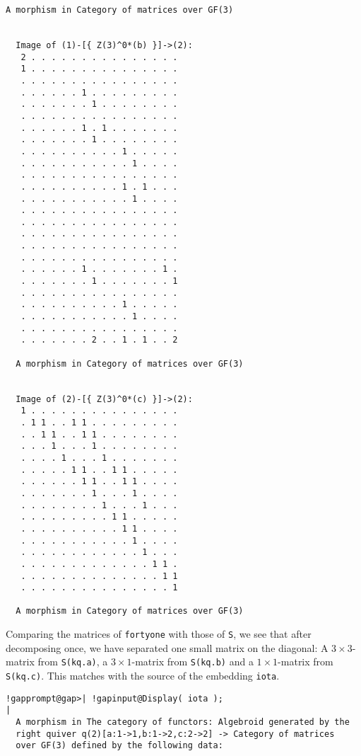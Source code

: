 \begin{computation}
\begin{Verbatim}[commandchars=!@|,fontsize=\small,frame=single,label=Example]
  A morphism in Category of matrices over GF(3)
  
  
  Image of (1)-[{ Z(3)^0*(b) }]->(2):
   2 . . . . . . . . . . . . . . .
   1 . . . . . . . . . . . . . . .
   . . . . . . . . . . . . . . . .
   . . . . . . 1 . . . . . . . . .
   . . . . . . . 1 . . . . . . . .
   . . . . . . . . . . . . . . . .
   . . . . . . 1 . 1 . . . . . . .
   . . . . . . . 1 . . . . . . . .
   . . . . . . . . . . 1 . . . . .
   . . . . . . . . . . . 1 . . . .
   . . . . . . . . . . . . . . . .
   . . . . . . . . . . 1 . 1 . . .
   . . . . . . . . . . . 1 . . . .
   . . . . . . . . . . . . . . . .
   . . . . . . . . . . . . . . . .
   . . . . . . . . . . . . . . . .
   . . . . . . . . . . . . . . . .
   . . . . . . . . . . . . . . . .
   . . . . . . 1 . . . . . . . 1 .
   . . . . . . . 1 . . . . . . . 1
   . . . . . . . . . . . . . . . .
   . . . . . . . . . . 1 . . . . .
   . . . . . . . . . . . 1 . . . .
   . . . . . . . . . . . . . . . .
   . . . . . . . 2 . . 1 . 1 . . 2
  
  A morphism in Category of matrices over GF(3)
  
  
  Image of (2)-[{ Z(3)^0*(c) }]->(2):
   1 . . . . . . . . . . . . . . .
   . 1 1 . . 1 1 . . . . . . . . .
   . . 1 1 . . 1 1 . . . . . . . .
   . . . 1 . . . 1 . . . . . . . .
   . . . . 1 . . . 1 . . . . . . .
   . . . . . 1 1 . . 1 1 . . . . .
   . . . . . . 1 1 . . 1 1 . . . .
   . . . . . . . 1 . . . 1 . . . .
   . . . . . . . . 1 . . . 1 . . .
   . . . . . . . . . 1 1 . . . . .
   . . . . . . . . . . 1 1 . . . .
   . . . . . . . . . . . 1 . . . .
   . . . . . . . . . . . . 1 . . .
   . . . . . . . . . . . . . 1 1 .
   . . . . . . . . . . . . . . 1 1
   . . . . . . . . . . . . . . . 1
  
  A morphism in Category of matrices over GF(3)
\end{Verbatim}
 Comparing the matrices of \texttt{fortyone} with those of \texttt{S}, we see that after decomposing once, we have separated one small matrix on
the diagonal: A $3\times 3$-matrix from \texttt{S(kq.a)}, a $3 \times 1$-matrix from \texttt{S(kq.b)} and a $1\times 1$-matrix from \texttt{S(kq.c)}. This matches with the source of the embedding \texttt{iota}. 
\begin{Verbatim}[commandchars=!@|,fontsize=\small,frame=single,label=Example]
  !gapprompt@gap>| !gapinput@Display( iota );
|
  A morphism in The category of functors: Algebroid generated by the
  right quiver q(2)[a:1->1,b:1->2,c:2->2] -> Category of matrices
  over GF(3) defined by the following data:
  

\end{Verbatim}
\end{computation}
